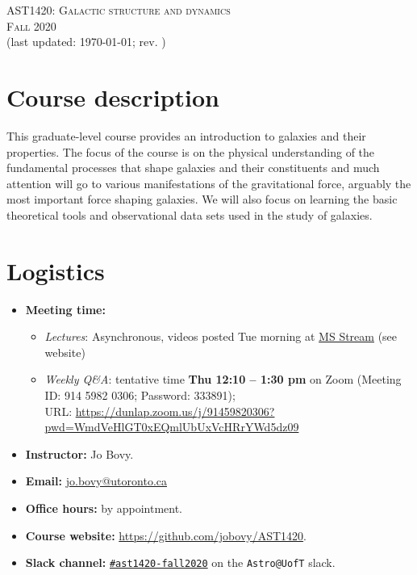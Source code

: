 \documentclass{article}
\begin{document}
\begin{center}
  \LARGE{\scshape{AST1420: Galactic structure and dynamics}}\\[5pt]
  \Large{\scshape{Fall 2020}}\\[5pt]
  \large{(last updated: \today; rev. \githash)}\\[25pt]
\end{center}

\section*{Course description}

This graduate-level course provides an introduction to galaxies and
their properties. The focus of the course is on the physical
understanding of the fundamental processes that shape galaxies and
their constituents and much attention will go to various
manifestations of the gravitational force, arguably the most important
force shaping galaxies. We will also focus on learning the basic
theoretical tools and observational data sets used in the study of
galaxies.

\section*{Logistics}

\begin{itemize}

\item {\bf Meeting time:}
  \begin{itemize}
  \item \emph{Lectures}: Asynchronous, videos posted Tue morning at \href{https://web.microsoftstream.com/browse?q=%23AST1420}{MS Stream} (see website)
  \item \emph{Weekly Q\&A}: tentative time {\bf Thu 12:10 -- 1:30 pm} on Zoom (Meeting ID: 914 5982 0306; Password: 333891);\\ URL: \url{https://dunlap.zoom.us/j/91459820306?pwd=WmdVeHlGT0xEQmlUbUxVcHRrYWd5dz09}
  \end{itemize}

  \item {\bf Instructor:} Jo Bovy.

  \item {\bf Email:} \href{mailto:jo.bovy@utoronto.ca}{jo.bovy@utoronto.ca}

  \item {\bf Office hours:} by appointment.

  \item {\bf Course website:} \url{https://github.com/jobovy/AST1420}.

  \item {\bf Slack channel:} \href{https://astro-uoft.slack.com/archives/C01A5HURVAA}{\texttt{\#ast1420-fall2020}} on the \texttt{Astro@UofT} slack.

\end{itemize}
\end{document}
